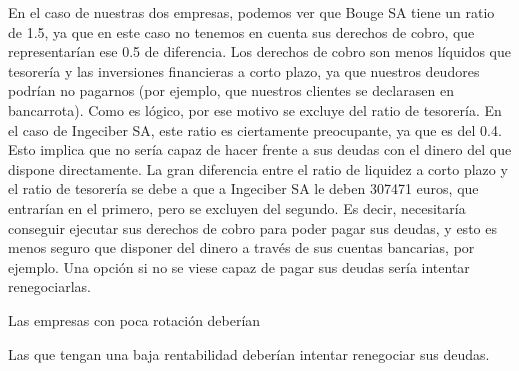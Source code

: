 \documentclass[a4paper]{article}
\begin{document}
En el caso de nuestras dos empresas, podemos ver que Bouge SA tiene un ratio de 1.5, ya que en este caso no tenemos en cuenta sus derechos de cobro, que representarían ese 0.5 de diferencia. Los derechos de cobro son menos líquidos que tesorería y las inversiones financieras a corto plazo, ya que nuestros deudores podrían no pagarnos (por ejemplo, que nuestros clientes se declarasen en bancarrota). Como es lógico, por ese motivo se excluye del ratio de tesorería. En el caso de Ingeciber SA, este ratio es ciertamente preocupante, ya que es del 0.4. Esto implica que no sería capaz de hacer frente a sus deudas con el dinero del que dispone directamente. La gran diferencia entre el ratio de liquidez a corto plazo y el ratio de tesorería se debe a que a Ingeciber SA le deben 307471 euros, que entrarían en el primero, pero se excluyen del segundo. Es decir, necesitaría conseguir ejecutar sus derechos de cobro para poder pagar sus deudas, y esto es menos seguro que disponer del dinero a través de sus cuentas bancarias, por ejemplo. Una opción si no se viese capaz de pagar sus deudas sería intentar renegociarlas.

Las empresas con poca rotación deberían 

Las que tengan una baja rentabilidad deberían intentar renegociar sus deudas.
\end{document}
